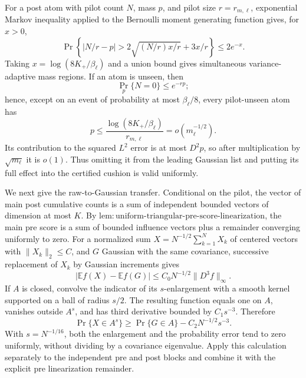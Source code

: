 For a post atom with pilot count \(N\), mass \(p\), and pilot size \(r=r_{m,\ell}\), exponential Markov inequality applied to the Bernoulli moment generating function gives, for \(x>0\),
\[
 \Pr\left\{|N/r-p|>
 2\sqrt{(N/r)x/r}+3x/r\right\}\leq2e^{-x}.
\]
Taking \(x=\log(8K_+/\beta_\ell)\) and a union bound gives simultaneous variance-adaptive mass regions.  If an atom is unseen, then
\[
 \Pr_p\{N=0\}\leq e^{-rp};
\]
hence, except on an event of probability at most \(\beta_\ell/8\), every pilot-unseen atom has
\[
 p\leq\frac{\log(8K_+/\beta_\ell)}{r_{m,\ell}}
 =o(m_\ell^{-1/2}).
\]
Its contribution to the squared \(L^2\) error is at most \(D^2p\), so after multiplication by \(\sqrt{m_\ell}\) it is \(o(1)\).  Thus omitting it from the leading Gaussian list and putting its full effect into the certified cushion is valid uniformly.

We next give the raw-to-Gaussian transfer.  Conditional on the pilot, the vector of main post cumulative counts is a sum of independent bounded vectors of dimension at most \(K\).  By \(\mathrm{lem:uniform\mbox{-}triangular\mbox{-}pre\mbox{-}score\mbox{-}linearization}\), the main pre score is a sum of bounded influence vectors plus a remainder converging uniformly to zero.  For a normalized sum \(X=N^{-1/2}\sum_{k=1}^NX_k\) of centered vectors with \(\|X_k\|_2\leq C\), and \(G\) Gaussian with the same covariance, successive replacement of \(X_k\) by Gaussian increments gives
\[
 |\mathbb Ef(X)-\mathbb Ef(G)|
 \leq C_0N^{-1/2}\|D^3f\|_\infty.
\]
If \(A\) is closed, convolve the indicator of its \(s\)-enlargement with a smooth kernel supported on a ball of radius \(s/2\).  The resulting function equals one on \(A\), vanishes outside \(A^s\), and has third derivative bounded by \(C_1s^{-3}\).  Therefore
\[
 \Pr\{X\in A^s\}\geq\Pr\{G\in A\}
   -C_2N^{-1/2}s^{-3}.
\]
With \(s=N^{-1/16}\), both the enlargement and the probability error tend to zero uniformly, without dividing by a covariance eigenvalue.  Apply this calculation separately to the independent pre and post blocks and combine it with the explicit pre linearization remainder.

